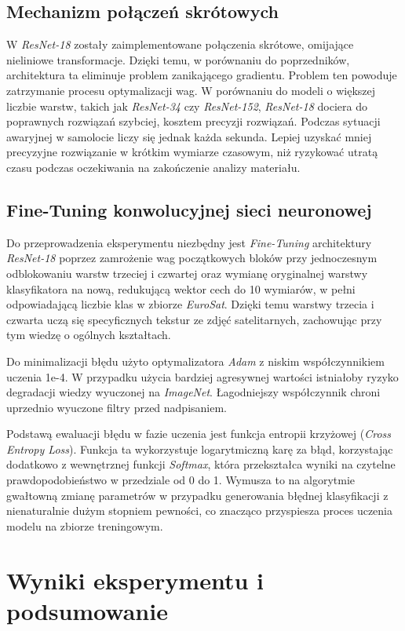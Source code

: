 \documentclass[12pt, a4paper]{report}
\begin{document}
\section{Mechanizm połączeń skrótowych}
W \emph{ResNet-18} zostały zaimplementowane połączenia skrótowe, omijające nieliniowe transformacje. \cite{he_resnet} Dzięki temu, w porównaniu do poprzedników, architektura ta eliminuje problem zanikającego gradientu. Problem ten powoduje zatrzymanie procesu optymalizacji wag. W porównaniu do modeli o większej liczbie warstw, takich jak \emph{ResNet-34} czy \emph{ResNet-152}, \emph{ResNet-18} dociera do poprawnych rozwiązań szybciej, kosztem precyzji rozwiązań. Podczas sytuacji awaryjnej w samolocie liczy się jednak każda sekunda. Lepiej uzyskać mniej precyzyjne rozwiązanie w krótkim wymiarze czasowym, niż ryzykować utratą czasu podczas oczekiwania na zakończenie analizy materiału.

\section{Fine-Tuning konwolucyjnej sieci neuronowej}
Do przeprowadzenia eksperymentu niezbędny jest \emph{Fine-Tuning} architektury \emph{ResNet-18} poprzez zamrożenie wag początkowych bloków przy jednoczesnym odblokowaniu warstw trzeciej i czwartej oraz wymianę oryginalnej warstwy klasyfikatora na nową, redukującą wektor cech do 10 wymiarów, w pełni odpowiadającą liczbie klas w zbiorze \emph{EuroSat}. Dzięki temu warstwy trzecia i czwarta uczą się specyficznych tekstur ze zdjęć satelitarnych, zachowując przy tym wiedzę o ogólnych kształtach.
\par Do minimalizacji błędu użyto optymalizatora \emph{Adam} z niskim współczynnikiem uczenia 1e-4. W przypadku użycia bardziej agresywnej wartości istniałoby ryzyko degradacji wiedzy wyuczonej na \emph{ImageNet}. Łagodniejszy współczynnik chroni uprzednio wyuczone filtry przed nadpisaniem.
\par Podstawą ewaluacji błędu w fazie uczenia jest funkcja entropii krzyżowej (\emph{Cross Entropy Loss}). Funkcja ta wykorzystuje logarytmiczną karę za błąd, korzystając dodatkowo z wewnętrznej funkcji \emph{Softmax}, która przekształca wyniki na czytelne prawdopodobieństwo w przedziale od 0 do 1. Wymusza to na algorytmie gwałtowną zmianę parametrów w przypadku generowania błędnej klasyfikacji z nienaturalnie dużym stopniem pewności, co znacząco przyspiesza proces uczenia modelu na zbiorze treningowym.


\chapter{Wyniki eksperymentu i podsumowanie}
\end{document}
